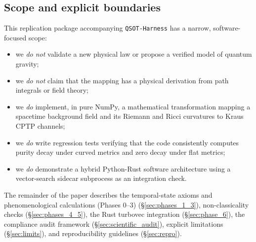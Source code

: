 \subsection{Scope and explicit boundaries}
This replication package accompanying \texttt{QSOT-Harness} has a narrow, software-focused scope:
\begin{itemize}[leftmargin=*]
  \item we \emph{do not} validate a new physical law or propose a verified model of quantum gravity;
  \item we \emph{do not} claim that the mapping has a physical derivation from path integrals or field theory;
  \item we \emph{do} implement, in pure NumPy, a mathematical transformation mapping a spacetime background field and its Riemann and Ricci curvatures to Kraus CPTP channels;
  \item we \emph{do} write regression tests verifying that the code consistently computes purity decay under curved metrics and zero decay under flat metrics;
  \item we \emph{do} demonstrate a hybrid Python-Rust software architecture using a vector-search sidecar subprocess as an integration check.
\end{itemize}

The remainder of the paper describes the temporal-state axioms and phenomenological calculations (Phases 0--3) (\S\ref{sec:phases_1_3}), non-classicality checks (\S\ref{sec:phases_4_5}), the Rust turbovec integration (\S\ref{sec:phase_6}), the compliance audit framework (\S\ref{sec:scientific_audit}), explicit limitations (\S\ref{sec:limits}), and reproducibility guidelines (\S\ref{sec:repro}).
